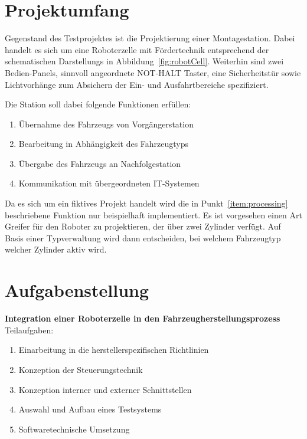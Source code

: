\section{Projektumfang}
Gegenstand des Testprojektes ist die Projektierung einer Montagestation. Dabei handelt es sich um eine Roboterzelle mit Fördertechnik entsprechend der schematischen Darstellungs in Abbildung~\ref{fig:robotCell}.
Weiterhin sind zwei Bedien-Panels, sinnvoll angeordnete NOT-HALT Taster, eine Sicherheitstür sowie Lichtvorhänge zum Absichern der Ein- und Ausfahrtbereiche spezifiziert.

Die Station soll dabei folgende Funktionen erfüllen:
\begin{enumerate}
	\itemsep0.1em
	\item Übernahme des Fahrzeugs von Vorgängerstation
	\item \label{item:processing}Bearbeitung in Abhängigkeit des Fahrzeugtyps
	\item Übergabe des Fahrzeugs an Nachfolgestation
	\item Kommunikation mit übergeordneten IT-Systemen
\end{enumerate}

Da es sich um ein fiktives Projekt handelt wird die in Punkt~\ref{item:processing} beschriebene Funktion nur beispielhaft implementiert. Es ist vorgesehen einen Art Greifer für den Roboter zu projektieren, der über zwei Zylinder verfügt. Auf Basis einer Typverwaltung wird dann entscheiden, bei welchem Fahrzeugtyp welcher Zylinder aktiv wird.

\section{Aufgabenstellung}

\textbf{Integration einer Roboterzelle in den Fahrzeugherstellungsprozess}\leer
Teilaufgaben:%
\begin{enumerate}
	\item Einarbeitung in die herstellerspezifischen Richtlinien
	\item Konzeption der Steuerungstechnik
	\item Konzeption interner und externer Schnittstellen
	\item Auswahl und Aufbau eines Testsystems
	\item Softwaretechnische Umsetzung
\end{enumerate}
